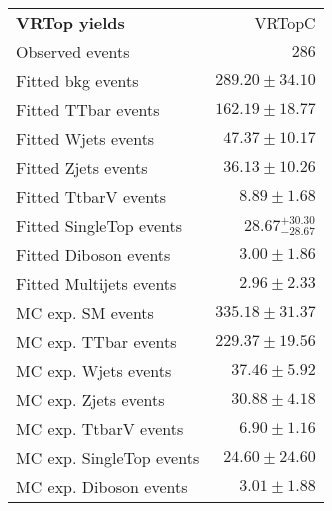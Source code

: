 

\begin{table} [h!]
\begin{center}
\setlength{\tabcolsep}{0.0pc}
{\small
\begin{tabular*}{\textwidth}{@{\extracolsep{\fill}}lr}
\noalign{\smallskip}\hline\noalign{\smallskip}
{\bf VRTop yields}           & VRTopC               \\[-0.05cm]
\noalign{\smallskip}\hline\noalign{\smallskip}
Observed events          & $286$                            \\
\noalign{\smallskip}\hline\noalign{\smallskip}
Fitted bkg events         & $289.20 \pm 34.10$                   \\
\noalign{\smallskip}\hline\noalign{\smallskip}
        Fitted TTbar events         & $162.19 \pm 18.77$                   \\
        Fitted Wjets events         & $47.37 \pm 10.17$                    \\
        Fitted Zjets events         & $36.13 \pm 10.26$                   \\
        Fitted TtbarV events         & $8.89 \pm 1.68$                   \\
        Fitted SingleTop events         & $28.67_{-28.67}^{+30.30}$                      \\
        Fitted Diboson events         & $3.00 \pm 1.86$                       \\
        Fitted Multijets events         & $2.96 \pm 2.33$                      \\
 \noalign{\smallskip}\hline\noalign{\smallskip}
MC exp. SM events              & $335.18 \pm 31.37$                     \\
\noalign{\smallskip}\hline\noalign{\smallskip}
        MC exp. TTbar events         & $229.37 \pm 19.56$                   \\
        MC exp. Wjets events         & $37.46 \pm 5.92$                      \\
        MC exp. Zjets events         & $30.88 \pm 4.18$                   \\
        MC exp. TtbarV events         & $6.90 \pm 1.16$                 \\
        MC exp. SingleTop events         & $24.60 \pm 24.60$                     \\
        MC exp. Diboson events         & $3.01 \pm 1.88$                     \\

\end{tabular*}}
\end{center}
\end{table}

